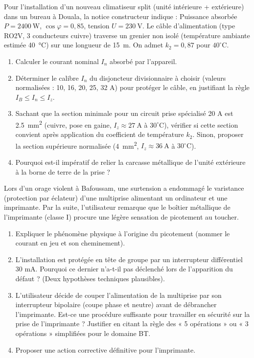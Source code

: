 \documentclass[11pt]{article}
\begin{document}
\begin{exercice}
Pour l'installation d'un nouveau climatiseur split (unité intérieure + extérieure) dans un bureau à Douala, la notice constructeur indique : Puissance absorbée $P = \SI{2400}{\watt}$, $\cos \varphi = 0,85$, tension $U = \SI{230}{\volt}$. Le câble d'alimentation (type RO2V, 3 conducteurs cuivre) traverse un grenier non isolé (température ambiante estimée \SI{40}{\celsius}) sur une longueur de \SI{15}{\meter}. On admet $k_2 = 0,87$ pour $40^\circ\mathrm{C}$.

\begin{enumerate}
    \item Calculer le courant nominal $I_n$ absorbé par l'appareil.
    \item Déterminer le calibre $I_n$ du disjoncteur divisionnaire à choisir (valeurs normalisées : 10, 16, 20, 25, 32 A) pour protéger le câble, en justifiant la règle $I_B \le I_n \le I_z$.
    \item Sachant que la section minimale pour un circuit prise spécialisé 20 A est \SI{2,5}{\square\milli\meter} (cuivre, pose en gaine, $I_z \approx \SI{27}{\ampere}$ à $30^\circ\mathrm{C}$), vérifier si cette section convient après application du coefficient de température $k_2$. Sinon, proposer la section supérieure normalisée (\SI{4}{\square\milli\meter}, $I_z \approx \SI{36}{\ampere}$ à $30^\circ\mathrm{C}$).
    \item Pourquoi est-il impératif de relier la carcasse métallique de l'unité extérieure à la borne de terre de la prise ?
\end{enumerate}
\end{exercice}

\begin{exercice}
Lors d'un orage violent à Bafoussam, une surtension a endommagé le varistance (protection par éclateur) d'une multiprise alimentant un ordinateur et une imprimante. Par la suite, l'utilisateur remarque que le boîtier métallique de l'imprimante (classe I) procure une légère sensation de picotement au toucher.

\begin{enumerate}
    \item Expliquer le phénomène physique à l'origine du picotement (nommer le courant en jeu et son cheminement).
    \item L'installation est protégée en tête de groupe par un interrupteur différentiel 30 mA. Pourquoi ce dernier n'a-t-il pas déclenché lors de l'apparition du défaut ? (Deux hypothèses techniques plausibles).
    \item L'utilisateur décide de couper l'alimentation de la multiprise par son interrupteur bipolaire (coupe phase et neutre) avant de débrancher l'imprimante. Est-ce une procédure suffisante pour travailler en sécurité sur la prise de l'imprimante ? Justifier en citant la règle des « 5 opérations » ou « 3 opérations » simplifiées pour le domaine BT.
    \item Proposer une action corrective définitive pour l'imprimante.
\end{enumerate}
\end{exercice}
\end{document}

